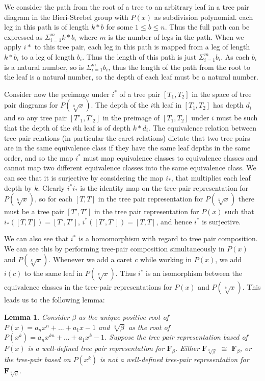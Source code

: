 \documentclass[
11pt, %
english, %
singlespacing, %
parskip, %
headsepline, %
]{amsart} %
\newtheorem{lemma}[theorem]{Lemma}
\theoremstyle{definition}
\newcommand{\FN}[1]{$\textbf{F}_{#1}$}
\begin{document}
\par
We consider the path from the root of a tree to an arbitrary leaf in a tree pair diagram in the Bieri-Strebel group with $P(x)$ as subdivision polynomial. each leg in this path is of length $k*b$ for some $1 \leq b \leq n$. Thus the full path can be expressed as $\Sigma_{i=1}^m k*b_i$ where $m$ is the number of legs in the path. When we apply $i*$ to this tree pair, each leg in this path is mapped from a leg of length $k*b_i$ to a leg of length $b_i$. Thus the length of this path is just $\Sigma_{i=1}^m b_i$. As each $b_i$ is a natural number, so is $\Sigma_{i=1}^m b_i$, thus the length of the path from the root to the leaf is a natural number, so the depth of each leaf must be a natural number.
\par
Consider now the preimage under $i^*$ of a tree pair $[T_1,T_2]$ in the space of tree pair diagrams for $P(\sqrt[k]{x})$. The depth of the $i$th leaf in $[T_1,T_2]$ has depth $d_i$ and so any tree pair $[T'_1,T'_2]$ in the preimage of $[T_1,T_2]$ under $i$ must be such that the depth of the $i$th leaf is of depth $k*d_i$. The equivalence relation between tree pair relations (in particular the caret relations) dictate that two tree pairs are in the same equivalence class if they have the same leaf depths in the same order, and so the map $i^*$ must map equivalence classes to equivalence classes and cannot map two different equivalence classes into the same equivalence class. We can see that it is surjective by considering the map $i_*$, that multiplies each leaf depth by $k$. Clearly $i^* i_*$ is the identity map on the tree-pair representation for $P(\sqrt[k]{x})$, so  for each $[T,T]$ in the tree pair representation for $P(\sqrt[k]{x})$ there must be a tree pair $[T',T']$ in the tree pair representation for $P(x)$ such that $i_*([T,T])=[T',T']$, $i^*([T',T'])= [T,T]$, and hence $i^*$ is surjective. 

We can also see that $i^*$ is a homomorphism with regard to tree pair composition. We can see this by performing tree-pair composition simultaneously in $P(x)$ and $P(\sqrt[k]{x})$. Whenever we add a caret $c$ while working in $P(x)$, we add $i(c)$ to the same leaf in $P(\sqrt[k]{x})$. Thus $i^*$ is an isomorphism between the equivalence classes in the tree-pair representations for $P(x)$ and $P(\sqrt[k]{x})$. This leads us to the following lemma:

\begin{lemma}\label{treepairdrop}
Consider $\beta$ as the unique positive root of $P(x) = a_n x^n +...+ a_1 x -1$ and $\sqrt[k]{\beta}$ as the root of $P(x^k) = a_n x^{kn} + ... + a_1 x^k -1$. Suppose the tree pair representation based of $P(x)$ is a well-defined tree pair representation for \FN{\beta}. Either \FN{\sqrt[k]{\beta}} $\cong$ \FN{\beta}, or the tree-pair based on $P(x^k)$ is not a well-defined tree-pair representation for \FN{\sqrt[k]{\beta}}. 
\end{lemma}
\end{document}
